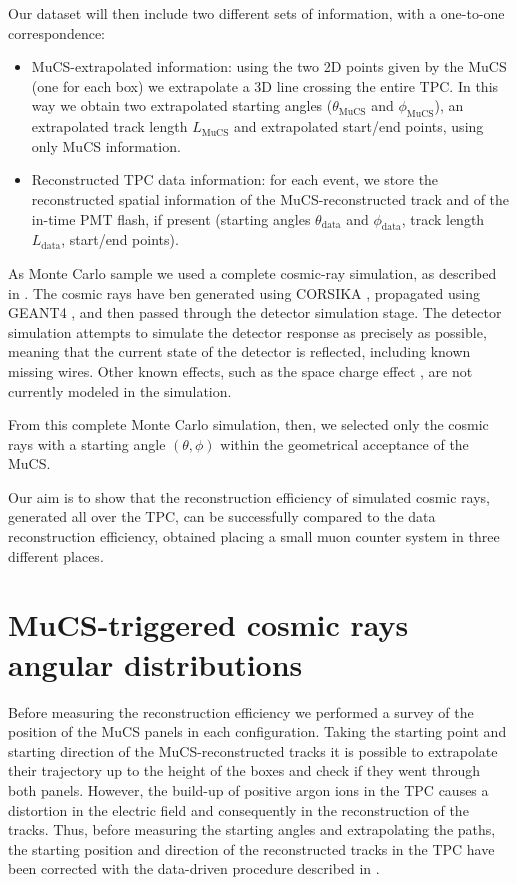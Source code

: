 \documentclass[a4paper]{scrartcl}
\begin{document}
Our dataset will then include two different sets of information, with a one-to-one correspondence:
\begin{itemize}
  \item MuCS-extrapolated information: using the two 2D points given by the MuCS (one for each box) we extrapolate a 3D line crossing the entire TPC. In this way we obtain two extrapolated starting angles ($\theta_{\textrm{MuCS}}$ and $\phi_{\textrm{MuCS}}$), an extrapolated track length $L_{\textrm{MuCS}}$ and extrapolated start/end points, using only MuCS information.
  \item Reconstructed TPC data information: for each event, we store the reconstructed spatial information of the MuCS-reconstructed track and of the in-time PMT flash, if present (starting angles $\theta_{\textrm{data}}$ and $\phi_{\textrm{data}}$, track length $L_{\textrm{data}}$, start/end points).
\end{itemize}


As Monte Carlo sample we used a complete cosmic-ray simulation, as described in \cite{cosmic}. The cosmic rays have ben generated using CORSIKA \cite{corsika},  propagated using GEANT4 \cite{geant}, and then passed through the detector simulation stage. The detector simulation attempts to simulate the detector response as precisely as possible, meaning that the current state of the detector is reflected, including known missing wires. Other known effects, such as the space charge effect \cite{sce}, are not currently modeled in the simulation.

From this complete Monte Carlo simulation, then, we selected only the cosmic rays with a starting angle $(\theta,\phi)$ within the geometrical acceptance of the MuCS.

Our aim is to show that the reconstruction efficiency of simulated cosmic rays, generated all over the TPC, can be successfully compared to the data reconstruction efficiency, obtained placing a small muon counter system in three different places.

\section{MuCS-triggered cosmic rays angular distributions}\label{sec:flux}
Before measuring the reconstruction efficiency we performed a survey of the position of the MuCS panels in each configuration. Taking the starting point and starting direction of the MuCS-reconstructed tracks it is possible to extrapolate their trajectory up to the height of the boxes and check if they went through both panels. However, the build-up of positive argon ions in the TPC causes a distortion in the electric field and consequently in the reconstruction of the tracks. Thus, before measuring the starting angles and extrapolating the paths, the starting position and direction of the reconstructed tracks in the TPC have been corrected with the data-driven procedure described in \cite{sce}.
\end{document}
